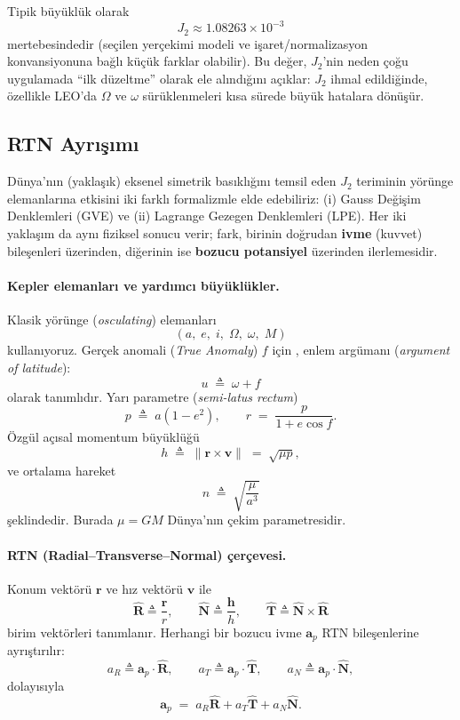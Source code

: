Tipik büyüklük olarak
\[
J_2 \approx 1.08263\times10^{-3}
\]
mertebesindedir (seçilen yerçekimi modeli ve işaret/normalizasyon konvansiyonuna bağlı küçük farklar olabilir).
Bu değer, $J_2$’nin neden çoğu uygulamada ``ilk düzeltme'' olarak ele alındığını açıklar:
$J_2$ ihmal edildiğinde, özellikle LEO’da $\Omega$ ve $\omega$ sürüklenmeleri kısa sürede büyük hatalara dönüşür.



\subsection*{RTN Ayrışımı}
\label{subsec:J2_setup}

Dünya’nın (yaklaşık) eksenel simetrik basıklığını temsil eden $J_2$ teriminin yörünge elemanlarına etkisini iki farklı formalizmle elde edebiliriz:
(i) Gauss Değişim Denklemleri (GVE) ve
(ii) Lagrange Gezegen Denklemleri (LPE).
Her iki yaklaşım da aynı fiziksel sonucu verir; fark, birinin doğrudan \textbf{ivme} (kuvvet) bileşenleri üzerinden, diğerinin ise \textbf{bozucu potansiyel} üzerinden ilerlemesidir.

\paragraph{Kepler elemanları ve yardımcı büyüklükler.}
Klasik yörünge (\emph{osculating}) elemanları
\[
(a,\;e,\;i,\;\Omega,\;\omega,\;M)
\]
kullanıyoruz. Gerçek anomali (\emph{True Anomaly}) $f$ için , enlem argümanı (\emph{argument of latitude}):
\[
u \;\triangleq\; \omega + f
\]
olarak tanımlıdır. Yarı parametre (\emph{semi-latus rectum})
\[
p \;\triangleq\; a(1-e^2),\qquad
r \;=\; \frac{p}{1+e\cos f}.
\]
Özgül açısal momentum büyüklüğü
\[
h \;\triangleq\; \|\mathbf r\times \mathbf v\| \;=\; \sqrt{\mu p},
\]
ve ortalama hareket
\[
n \;\triangleq\; \sqrt{\frac{\mu}{a^3}}
\]
şeklindedir. Burada $\mu=GM$ Dünya’nın çekim parametresidir.

\paragraph{RTN (Radial--Transverse--Normal) çerçevesi.}
Konum vektörü $\mathbf r$ ve hız vektörü $\mathbf v$ ile
\[
\hat{\mathbf R} \triangleq \frac{\mathbf r}{r},\qquad
\hat{\mathbf N} \triangleq \frac{\mathbf h}{h},\qquad
\hat{\mathbf T} \triangleq \hat{\mathbf N}\times \hat{\mathbf R}
\]
birim vektörleri tanımlanır.
Herhangi bir bozucu ivme $\mathbf a_p$ RTN bileşenlerine ayrıştırılır:
\[
a_R \triangleq \mathbf a_p\cdot \hat{\mathbf R},\qquad
a_T \triangleq \mathbf a_p\cdot \hat{\mathbf T},\qquad
a_N \triangleq \mathbf a_p\cdot \hat{\mathbf N},
\]
dolayısıyla
\[
\mathbf a_p \;=\; a_R\hat{\mathbf R} + a_T\hat{\mathbf T} + a_N\hat{\mathbf N}.
\]

